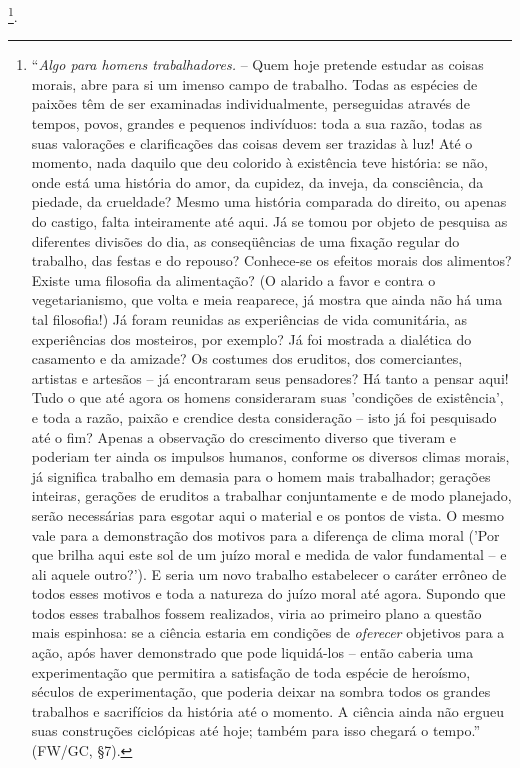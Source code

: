 \documentclass[
	12pt,				%
	openright,			%
	oneside,			%
	a4paper,			%
	english,			%
	french,				%
	spanish,			%
	brazil				%
	]{abntex2}
\begin{document}
\footnote{“\textit{Algo para homens trabalhadores.} – Quem hoje pretende estudar as coisas morais, abre para si um imenso campo de trabalho. Todas as espécies de paixões têm de ser examinadas individualmente, perseguidas através de tempos, povos, grandes e pequenos indivíduos: toda a sua razão, todas as suas valorações e clarificações das coisas devem ser trazidas à luz! Até o momento, nada daquilo que deu colorido à existência teve história: se não, onde está uma história do amor, da cupidez, da inveja, da consciência, da piedade, da crueldade? Mesmo uma história comparada do direito, ou apenas do castigo, falta inteiramente até aqui. Já se tomou por objeto de pesquisa as diferentes divisões do dia, as conseqüências de uma fixação regular do trabalho, das festas e do repouso? Conhece-se os efeitos morais dos alimentos? Existe uma filosofia da alimentação? (O alarido a favor e contra o vegetarianismo, que volta e meia reaparece, já mostra que ainda não há uma tal filosofia!) Já foram reunidas as experiências de vida comunitária, as experiências dos mosteiros, por exemplo? Já foi mostrada a dialética do casamento e da amizade? Os costumes dos eruditos, dos comerciantes, artistas e artesãos – já encontraram seus pensadores? Há tanto a pensar aqui! Tudo o que até agora os homens consideraram suas 'condições de existência', e toda a razão, paixão e crendice desta consideração – isto já foi pesquisado até o fim? Apenas a observação do crescimento diverso que tiveram e poderiam ter ainda os impulsos humanos, conforme os diversos climas morais, já significa trabalho em demasia para o homem mais trabalhador; gerações inteiras, gerações de eruditos a trabalhar conjuntamente e de modo planejado, serão necessárias para esgotar aqui o material e os pontos de vista. O mesmo vale para a demonstração dos motivos para a diferença de clima moral ('Por que brilha aqui este sol de um juízo moral e medida de valor fundamental – e ali aquele outro?'). E seria um novo trabalho estabelecer o caráter errôneo de todos esses motivos e toda a natureza do juízo moral até agora. Supondo que todos esses trabalhos fossem realizados, viria ao primeiro plano a questão mais espinhosa: se a ciência estaria em condições de \textit{oferecer} objetivos para a ação, após haver demonstrado que pode liquidá-los – então caberia uma experimentação que permitira a satisfação de toda espécie de heroísmo, séculos de experimentação, que poderia deixar na sombra todos os grandes trabalhos e sacrifícios da história até o momento. A ciência ainda não ergueu suas construções ciclópicas até hoje; também para isso chegará o tempo.” (FW/GC, §7).}.
\end{document}
